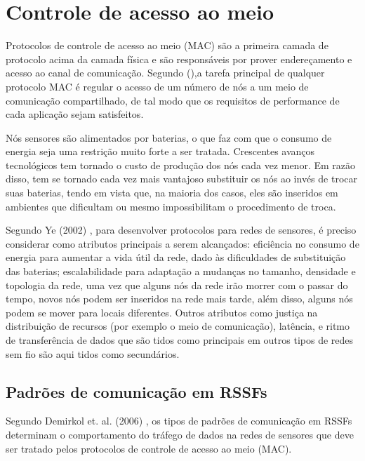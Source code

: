 \section{Controle de acesso ao meio}
\label{sec:macProtocols}

Protocolos de controle de acesso ao meio (MAC) são a primeira camada de protocolo acima da camada física e são responsáveis por prover endereçamento e acesso ao canal de comunicação. Segundo  (\citeyear{Karl2005}),a tarefa principal de qualquer protocolo MAC é regular o acesso de um número de nós a um meio de comunicação compartilhado, de tal modo que os requisitos de performance de cada aplicação sejam satisfeitos.

Nós sensores são alimentados por baterias, o que faz com que o consumo de energia seja uma restrição muito forte a ser tratada. Crescentes avanços tecnológicos tem tornado o custo de produção dos nós cada vez menor. Em razão disso, tem se tornado cada vez mais vantajoso substituir os nós ao invés de trocar suas baterias, tendo em vista que, na maioria dos casos, eles são inseridos em ambientes que dificultam ou mesmo impossibilitam o procedimento de troca. 

Segundo Ye (2002) \cite{Ye2002}, para desenvolver protocolos para redes de sensores, é preciso considerar como atributos principais a serem alcançados: eficiência no consumo de energia para aumentar a vida útil da rede, dado às dificuldades de substituição das baterias; escalabilidade para adaptação a mudanças no tamanho, densidade e topologia da rede, uma vez que alguns nós da rede irão morrer com o passar do tempo, novos nós podem ser inseridos na rede mais tarde, além disso, alguns nós podem se mover para locais diferentes. Outros atributos como justiça na distribuição de recursos (por exemplo o meio de comunicação), latência, e ritmo de transferência de dados que são tidos como principais em outros tipos de redes sem fio são aqui tidos como secundários.

\subsection{Padrões de comunicação em RSSFs}
\label{sec:comnPatt}
 
Segundo Demirkol et. al. (2006) \cite{Demirkol2006}, os tipos de padrões de comunicação em RSSFs determinam o comportamento do tráfego de dados na redes de sensores que deve ser tratado pelos protocolos de controle de acesso ao meio (MAC). 

